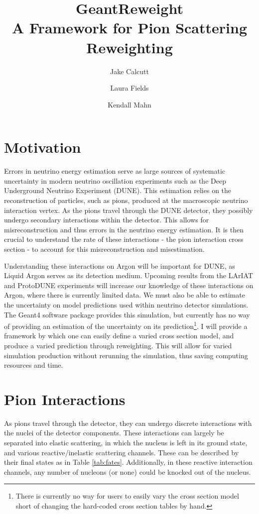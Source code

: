 \documentclass[12pt]{article}
\title{GeantReweight \\ 
   \large A Framework for Pion Scattering Reweighting}
\date{}
\begin{document}
\author[1]{Jake Calcutt}
\author[2]{Laura Fields}
\author[1]{Kendall Mahn}

\maketitle
\thispagestyle{fancy}

\section{Motivation}
Errors in neutrino energy estimation serve as large sources of systematic uncertainty in modern neutrino oscillation experiments such as the Deep Underground Neutrino Experiment (DUNE). This estimation relies on the reconstruction of particles, such as pions, produced at the macroscopic neutrino interaction vertex. As the pions travel through the DUNE detector, they possibly undergo secondary interactions within the detector. This allows for misreconstruction and thus errors in the neutrino energy estimation.  It is then crucial to understand the rate of these interactions - the pion interaction cross section - to account for this misreconstruction and misestimation. 

Understanding these interactions on Argon will be important for DUNE, as Liquid Argon serves as its detection medium. Upcoming results from the LArIAT and ProtoDUNE experiments will increase our knowledge of these interactions on Argon, where there is currently limited data. We must also be able to estimate the uncertainty on model predictions used within neutrino detector simulations. The Geant4 software package provides this simulation, but currently has no way of providing an estimation of the uncertainty on its prediction\footnote{There is currently no way for users to easily vary the cross section model short of changing the hard-coded cross section tables by hand.}. I will provide a framework by which one can easily define a varied cross section model, and produce a varied prediction through reweighting. This will allow for varied simulation production without rerunning the simulation, thus saving computing resources and time.

\section{Pion Interactions}
As pions travel through the detector, they can undergo discrete interactions with the nuclei of the detector components. These interactions can largely be separated into elastic scattering, in which the nucleus is left in its ground state, and various reactive/inelastic scattering channels. These can be described by their final states as in Table \ref{tab:fates}. Additionally, in these reactive interaction channels, any number of nucleons (or none) could be knocked out of the nucleus. 
\end{document}
